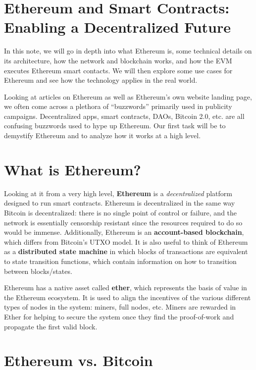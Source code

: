 \documentclass[full.tex]{subfiles}
\begin{document}
    \thispagestyle{firstpage}
    \vspace*{2\baselineskip}
    \section*{Ethereum and Smart Contracts: Enabling a Decentralized Future}
    
    In this note, we will go in depth into what Ethereum is, some technical details on its architecture, how the network and blockchain works, and how the EVM executes Ethereum smart contacts. We will then explore some use cases for Ethereum and see how the technology applies in the real world.
    
    Looking at articles on Ethereum as well as Ethereum's own website landing page, we often come across a plethora of ``buzzwords'' primarily used in publicity campaigns. Decentralized apps, smart contracts, DAOs, Bitcoin 2.0, etc. are all confusing buzzwords used to hype up Ethereum. Our first task will be to demystify Ethereum and to analyze how it works at a high level.
    
    \section*{What is Ethereum?}
    
    Looking at it from a very high level, \textbf{Ethereum} is a \textit{decentralized} platform designed to run smart contracts. Ethereum is decentralized in the same way Bitcoin is decentralized: there is no single point of control or failure, and the network is essentially censorship resistant since the resources required to do so would be immense. Additionally, Ethereum is an \textbf{account-based blockchain}, which differs from Bitcoin's UTXO model. It is also useful to think of Ethereum as a \textbf{distributed state machine} in which blocks of transactions are equivalent to state transition functions, which contain information on how to transition between blocks/states.
    
    Ethereum has a native asset called \textbf{ether}, which represents the basis of value in the Ethereum ecosystem. It is used to align the incentives of the various different types of nodes in the system: miners, full nodes, etc. Miners are rewarded in Ether for helping to secure the system once they find the proof-of-work and propagate the first valid block. 
    
    \section*{Ethereum vs. Bitcoin}
    
\end{document}
